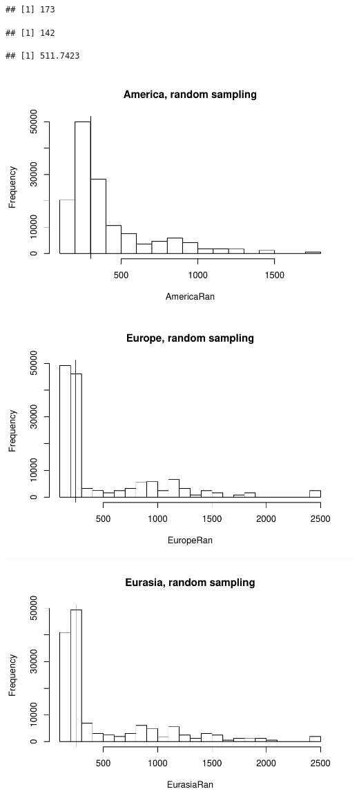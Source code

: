 \documentclass[]{article}
\begin{document}
\begin{verbatim}
## [1] 173
\end{verbatim}

\begin{verbatim}
## [1] 142
\end{verbatim}

\begin{verbatim}
## [1] 511.7423
\end{verbatim}

\includegraphics{MA_JJ_files/figure-latex/RSCon-1.pdf}
\includegraphics{MA_JJ_files/figure-latex/RSCon-2.pdf}
\includegraphics{MA_JJ_files/figure-latex/RSCon-3.pdf}
\end{document}
